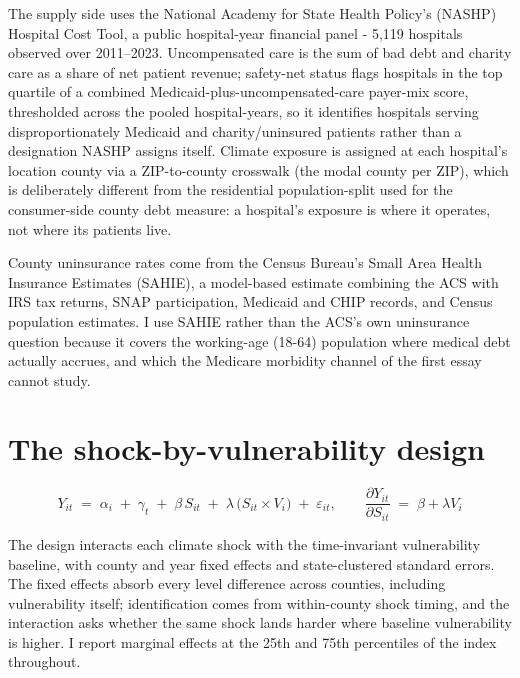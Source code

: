 \documentclass[a4paper,11pt]{article}
\begin{document}


The supply side uses the National Academy for State Health Policy's (NASHP) Hospital Cost Tool, a public hospital-year financial panel - 5,119 hospitals observed over 2011--2023. Uncompensated care is the sum of bad debt and charity care as a share of net patient revenue; safety-net status flags hospitals in the top quartile of a combined Medicaid-plus-uncompensated-care payer-mix score, thresholded across the pooled hospital-years, so it identifies hospitals serving disproportionately Medicaid and charity/uninsured patients rather than a designation NASHP assigns itself. Climate exposure is assigned at each hospital's location county via a ZIP-to-county crosswalk (the modal county per ZIP), which is deliberately different from the residential population-split used for the consumer-side county debt measure: a hospital's exposure is where it operates, not where its patients live.

County uninsurance rates come from the Census Bureau's Small Area Health Insurance Estimates (SAHIE), a model-based estimate combining the ACS with IRS tax returns, SNAP participation, Medicaid and CHIP records, and Census population estimates. I use SAHIE rather than the ACS's own uninsurance question because it covers the working-age (18-64) population where medical debt actually accrues, and which the Medicare morbidity channel of the first essay cannot study.

\FloatBarrier
\section{The shock-by-vulnerability design}

\begin{equation}
Y_{it} \;=\; \alpha_i \;+\; \gamma_t \;+\; \beta \, S_{it}
\;+\; \lambda \,\bigl(S_{it} \times V_i\bigr) \;+\; \varepsilon_{it},
\qquad \frac{\partial Y_{it}}{\partial S_{it}} \;=\; \beta + \lambda V_i
\label{eq:interaction}
\end{equation}

The design interacts each climate shock with the time-invariant vulnerability baseline, with county and year fixed effects and state-clustered standard errors. The fixed effects absorb every level difference across counties, including vulnerability itself; identification comes from within-county shock timing, and the interaction asks whether the same shock lands harder where baseline vulnerability is higher. I report marginal effects at the 25th and 75th percentiles of the index throughout.
\end{document}
